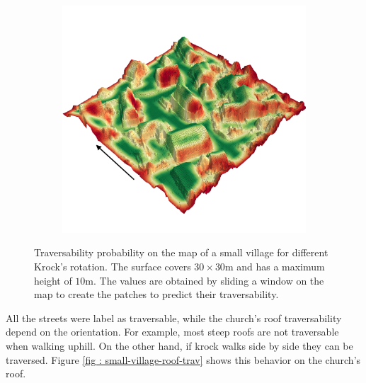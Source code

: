 \documentclass[../document.tex]{subfiles}
\begin{document}
\begin{figure} [htbp]
\begin{subfigure}[b]{0.45\textwidth}
  \end{subfigure}
  \begin{subfigure}[b]{0.45\textwidth}
      \includegraphics[width=\linewidth]{../img/4/traversability/sullens/-180.png}  
  \end{subfigure}
  \caption{Traversability probability on the map of a small village for different Krock's rotation. The surface covers $30\times 30$m and has a maximum height of $10$m. The values are obtained by sliding a window on the map to create the patches to predict their traversability.}
  \label{fig : small-village-trav}
  \end{figure}
  All the streets were label as traversable, while the church's roof traversability depend on the orientation. For example, most steep roofs are not traversable when walking uphill. On the other hand, if krock walks side by side they can be traversed. Figure \ref{fig : small-village-roof-trav} shows this behavior on the church's roof.
\end{document}
